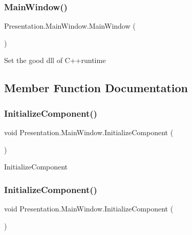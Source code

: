 \subsubsection{\texorpdfstring{Main\+Window()}{MainWindow()}}
{\footnotesize\ttfamily Presentation.\+Main\+Window.\+Main\+Window (\begin{DoxyParamCaption}{ }\end{DoxyParamCaption})}



Set the good dll of C++runtime 



\subsection{Member Function Documentation}
\mbox{\label{class_presentation_1_1_main_window_ae65bc3f86809be61714a19b6c8b9fba0}} 
\subsubsection{\texorpdfstring{Initialize\+Component()}{InitializeComponent()}\hspace{0.1cm}{\footnotesize\ttfamily [1/4]}}
{\footnotesize\ttfamily void Presentation.\+Main\+Window.\+Initialize\+Component (\begin{DoxyParamCaption}{ }\end{DoxyParamCaption})}



Initialize\+Component 

\mbox{\label{class_presentation_1_1_main_window_ae65bc3f86809be61714a19b6c8b9fba0}} 
\subsubsection{\texorpdfstring{Initialize\+Component()}{InitializeComponent()}\hspace{0.1cm}{\footnotesize\ttfamily [2/4]}}
{\footnotesize\ttfamily void Presentation.\+Main\+Window.\+Initialize\+Component (\begin{DoxyParamCaption}{ }\end{DoxyParamCaption})}




